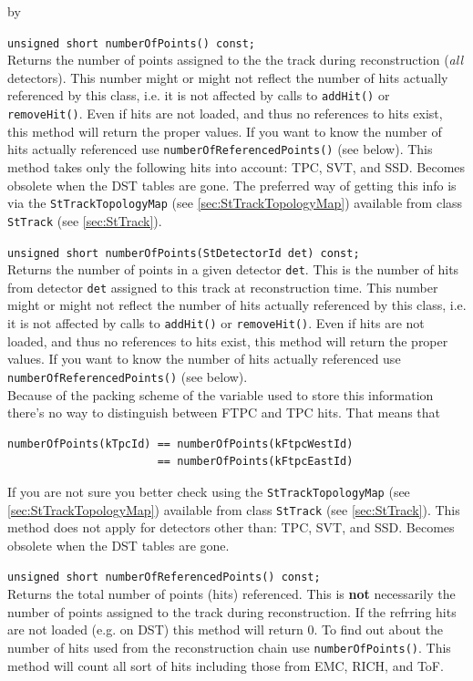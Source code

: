 \documentclass[twoside]{article}
\newcommand{\entrylabel}[1]{\mbox{\textbf{{#1}}}\hfil}%
\newenvironment{entry}
{\begin{list}{}%
    {\renewcommand{\makelabel}{\entrylabel}%
     \setlength{\labelwidth}{90pt}%
     \setlength{\leftmargin}{\labelwidth}
     \advance\leftmargin by \labelsep%
      }%
    }%
  {\end{list}}
\newcommand{\Entrylabel}[1]%
{\raisebox{0pt}[1ex][0pt]{\makebox[\labelwidth][l]%
    {\parbox[t]{\labelwidth}{\hspace{0pt}\textbf{{#1}}}}}}
\newenvironment{Entry}%
{\renewcommand{\entrylabel}{\Entrylabel}\begin{entry}}%
  {\end{entry}}
\begin{document}
\begin{Entry}
    \verb+unsigned short numberOfPoints() const;+\\
    Returns the number of points assigned to the the track during
    reconstruction (\emph{all} detectors).  This number might or might
    not reflect the number of hits actually referenced by this class,
    i.e. it is not affected by calls to \texttt{addHit()} or
    \texttt{removeHit()}. Even if hits are not loaded, and thus no
    references to hits exist, this method will return the proper
    values. If you want to know the number of hits actually referenced
    use \texttt{numberOfReferencedPoints()} (see below).
    This method takes only the following hits into account: TPC, SVT, and SSD.
    Becomes obsolete when the DST tables are gone.
    The preferred way of getting this info is via the \texttt{StTrackTopologyMap}
    (see \ref{sec:StTrackTopologyMap}) available from class \texttt{StTrack} (see
    \ref{sec:StTrack}). 


    \verb+unsigned short numberOfPoints(StDetectorId det) const;+\\
    Returns the number of points in a given detector \texttt{det}.
    This is the number of hits from detector \texttt{det} assigned to
    this track at reconstruction time. This number might or might not
    reflect the number of hits actually referenced by this class, i.e.
    it is not affected by calls to \texttt{addHit()} or
    \texttt{removeHit()}.  Even if hits are not loaded, and thus no
    references to hits exist, this method will return the proper
    values. If you want to know the number of hits actually referenced
    use \texttt{numberOfReferencedPoints()} (see below).\\
    Because of the packing scheme of the variable used to store
    this information there's no way to distinguish between FTPC and TPC
    hits. That means that
    \begin{verbatim}
numberOfPoints(kTpcId) == numberOfPoints(kFtpcWestId)
                       == numberOfPoints(kFtpcEastId)
    \end{verbatim}
    If you are not sure you better check using the \texttt{StTrackTopologyMap}
    (see \ref{sec:StTrackTopologyMap}) available from class \texttt{StTrack} (see
    \ref{sec:StTrack}). 
    This method does not apply for detectors other than: TPC, SVT, and SSD.
    Becomes obsolete when the DST tables are gone.

    
    \verb+unsigned short numberOfReferencedPoints() const;+\\
    Returns the total number of points (hits) referenced. This is
    \textbf{not} necessarily the number of points assigned to the
    track during reconstruction. If the refrring hits are not loaded
    (e.g. on DST) this method will return 0. To find out about the number of hits
    used from the reconstruction chain use \texttt{numberOfPoints()}.
    This method will count all sort of hits including those from EMC, RICH, and ToF.


\end{Entry}
\end{document}
